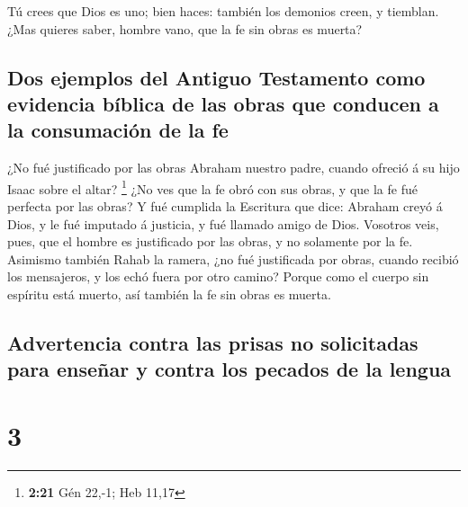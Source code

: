  Tú crees que Dios es uno; bien haces: también los demonios
creen, y tiemblan.  ¿Mas quieres saber, hombre vano, que la
fe sin obras es muerta?

\hypertarget{dos-ejemplos-del-antiguo-testamento-como-evidencia-buxedblica-de-las-obras-que-conducen-a-la-consumaciuxf3n-de-la-fe}{%
\subsection{Dos ejemplos del Antiguo Testamento como evidencia bíblica
de las obras que conducen a la consumación de la
fe}\label{dos-ejemplos-del-antiguo-testamento-como-evidencia-buxedblica-de-las-obras-que-conducen-a-la-consumaciuxf3n-de-la-fe}}

 ¿No fué justificado por las obras Abraham nuestro padre,
cuando ofreció á su hijo Isaac sobre el altar? \footnote{\textbf{2:21}
  Gén 22,-1; Heb 11,17}  ¿No ves que la fe obró con sus
obras, y que la fe fué perfecta por las obras?  Y fué
cumplida la Escritura que dice: Abraham creyó á Dios, y le fué imputado
á justicia, y fué llamado amigo de Dios.  Vosotros veis,
pues, que el hombre es justificado por las obras, y no solamente por la
fe.  Asimismo también Rahab la ramera, ¿no fué justificada
por obras, cuando recibió los mensajeros, y los echó fuera por otro
camino?  Porque como el cuerpo sin espíritu está muerto,
así también la fe sin obras es muerta.

\hypertarget{advertencia-contra-las-prisas-no-solicitadas-para-enseuxf1ar-y-contra-los-pecados-de-la-lengua}{%
\subsection{Advertencia contra las prisas no solicitadas para enseñar y
contra los pecados de la
lengua}\label{advertencia-contra-las-prisas-no-solicitadas-para-enseuxf1ar-y-contra-los-pecados-de-la-lengua}}

\hypertarget{section-2}{%
\section{3}\label{section-2}}

